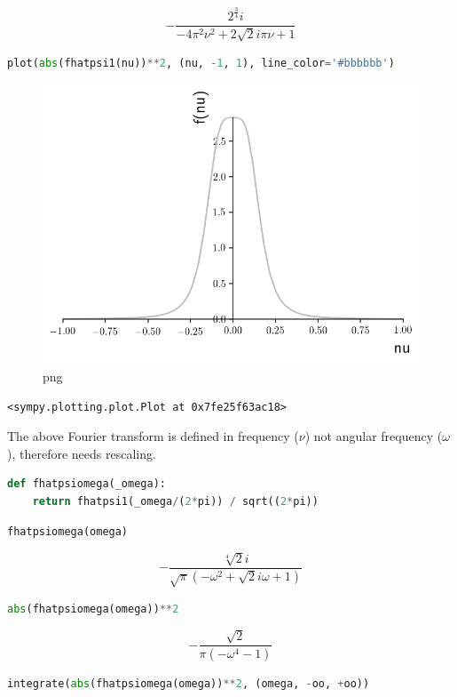 \[- \frac{2^{\frac{3}{4}} i}{- 4 \pi^{2} \nu^{2} + 2 \sqrt{2} i \pi \nu + 1}\]

\begin{lstlisting}[language=Python]
plot(abs(fhatpsi1(nu))**2, (nu, -1, 1), line_color='#bbbbbb')
\end{lstlisting}

\begin{figure}
\centering
\includegraphics[width=0.6\linewidth]{output_58_0.png}
\caption[]{png}
\end{figure}

\begin{lstlisting}
<sympy.plotting.plot.Plot at 0x7fe25f63ac18>
\end{lstlisting}

The above Fourier transform is defined in frequency ($\nu$) not angular
frequency ($\omega$), therefore needs rescaling.

\begin{lstlisting}[language=Python]
def fhatpsiomega(_omega):
    return fhatpsi1(_omega/(2*pi)) / sqrt((2*pi))
\end{lstlisting}

\begin{lstlisting}[language=Python]
fhatpsiomega(omega)
\end{lstlisting}

\begin{equation}\label{eq:fhatpsi1_omega}
    - \frac{\sqrt[4]{2} i}{\sqrt{\pi} \left(- \omega^{2} + \sqrt{2} i \omega + 1\right)}
\end{equation}

\begin{lstlisting}[language=Python]
abs(fhatpsiomega(omega))**2
\end{lstlisting}

\[- \frac{\sqrt{2}}{\pi \left(- \omega^{4} - 1\right)}\]

\begin{lstlisting}[language=Python]
integrate(abs(fhatpsiomega(omega))**2, (omega, -oo, +oo))
\end{lstlisting}

